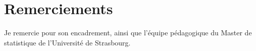 \chapter*{Remerciements}

Je remercie \encadrant{} pour son encadrement, ainsi que l'équipe
pédagogique du Master de statistique de l'Université de Strasbourg.

\vfill

